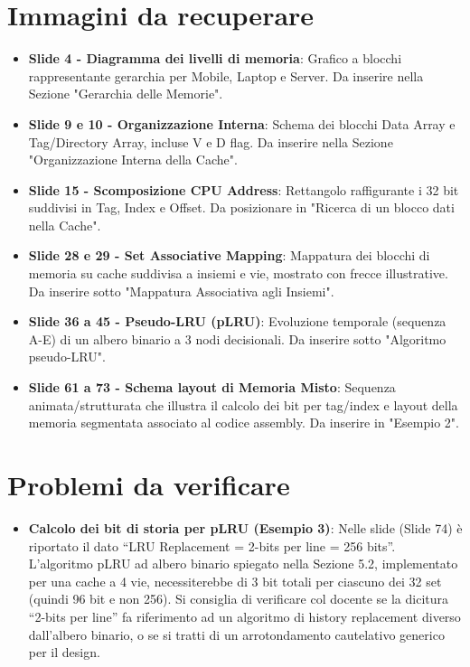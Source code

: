 \section*{Immagini da recuperare}
\begin{itemize}
    \item \textbf{Slide 4 - Diagramma dei livelli di memoria}: Grafico a blocchi rappresentante gerarchia per Mobile, Laptop e Server. Da inserire nella Sezione "Gerarchia delle Memorie".
    \item \textbf{Slide 9 e 10 - Organizzazione Interna}: Schema dei blocchi Data Array e Tag/Directory Array, incluse V e D flag. Da inserire nella Sezione "Organizzazione Interna della Cache".
    \item \textbf{Slide 15 - Scomposizione CPU Address}: Rettangolo raffigurante i 32 bit suddivisi in Tag, Index e Offset. Da posizionare in "Ricerca di un blocco dati nella Cache".
    \item \textbf{Slide 28 e 29 - Set Associative Mapping}: Mappatura dei blocchi di memoria su cache suddivisa a insiemi e vie, mostrato con frecce illustrative. Da inserire sotto "Mappatura Associativa agli Insiemi".
    \item \textbf{Slide 36 a 45 - Pseudo-LRU (pLRU)}: Evoluzione temporale (sequenza A-E) di un albero binario a 3 nodi decisionali. Da inserire sotto "Algoritmo pseudo-LRU".
    \item \textbf{Slide 61 a 73 - Schema layout di Memoria Misto}: Sequenza animata/strutturata che illustra il calcolo dei bit per tag/index e layout della memoria segmentata associato al codice assembly. Da inserire in "Esempio 2".
\end{itemize}

\section*{Problemi da verificare}
\begin{itemize}
    \item \textbf{Calcolo dei bit di storia per pLRU (Esempio 3)}: Nelle slide (Slide 74) è riportato il dato ``LRU Replacement = 2-bits per line = 256 bits''. L'algoritmo pLRU ad albero binario spiegato nella Sezione 5.2, implementato per una cache a 4 vie, necessiterebbe di 3 bit totali per ciascuno dei 32 set (quindi 96 bit e non 256). Si consiglia di verificare col docente se la dicitura ``2-bits per line'' fa riferimento ad un algoritmo di history replacement diverso dall'albero binario, o se si tratti di un arrotondamento cautelativo generico per il design.
\end{itemize}